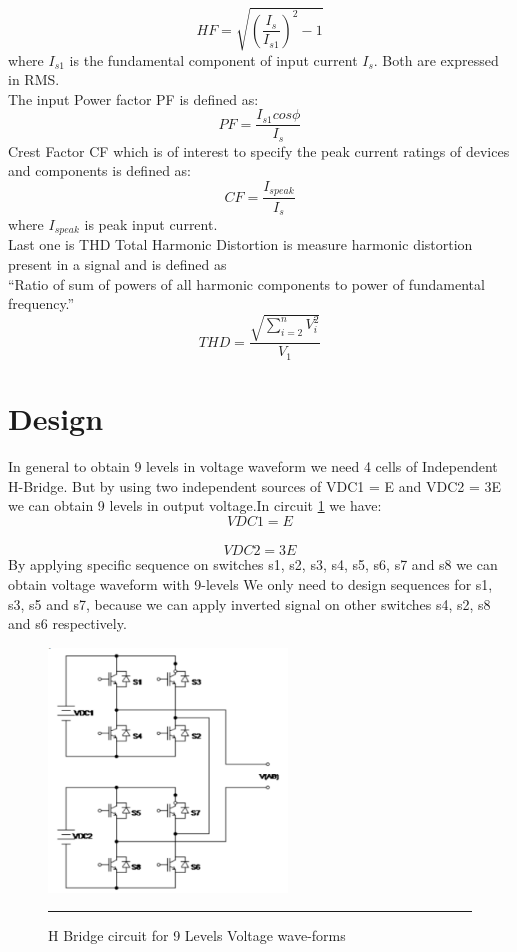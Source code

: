 \begin{equation}
HF=\sqrt{(\frac{I_s}{I_{s1}})^2-1}
\end{equation}
where $I_{s1}$ is the fundamental component of input current $I_s$. Both are expressed in RMS.\\
The input Power factor PF is defined as:
\begin{equation}
PF=\frac{I_{s1}cos\phi}{I_s}
\end{equation}
Crest Factor CF which is of interest to specify the peak current ratings of devices and components is defined as:
 \begin{equation}
CF=\frac{I_{speak}}{I_s}
\end{equation}
where $I_{speak}$ is peak input current.\\
 Last one is THD Total Harmonic Distortion is measure harmonic distortion present in a signal and is defined as\\
 ``Ratio of sum of powers of all harmonic components to power of fundamental frequency.''
  \begin{equation}
THD=\frac{\sqrt{\sum_{i=2}^{n}V_i^2}}{V_1}
\end{equation}
\section{Design}
In general to obtain 9 levels in voltage waveform we need 4 cells of Independent H-Bridge.
But by using two independent sources of VDC1 = E and VDC2 = 3E we can obtain 9 levels in output voltage.In circuit \ref{fig:1} we have:
$$VDC1 = E$$\\
$$VDC2 = 3E$$
By applying specific sequence on switches s1, s2, s3, s4, s5, s6, s7 and s8 we can obtain voltage waveform with 9-levels
We only need to design sequences for s1, s3, s5 and s7, because we can apply inverted signal on other switches s4, s2, s8 and s6 respectively.
\begin{figure}[htbp]
	\centering
		\includegraphics[width = 2.5in]{./Figures/design.pdf}
		\rule{35em}{5pt}
	\caption{H Bridge circuit for 9 Levels Voltage wave-forms}
	\label{fig:1}
\end{figure}

